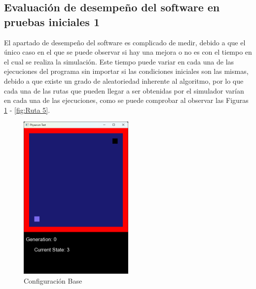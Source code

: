 \subsection{Evaluaci\'on de desempe\~no del software en pruebas iniciales 1}
    El apartado de desempe\~no del software es complicado de
        medir, debido a que el \'unico caso en el que se puede
        observar si hay una mejora o no es con el tiempo en el cual
        se realiza la simulaci\'on.
    \vskip 0.5cm
    Este tiempo puede variar en cada una de las ejecuciones del
        programa sin importar si las condiciones iniciales son las
        mismas, debido a que existe un grado de aleatoriedad
        inherente al algoritmo, por lo que cada una de las rutas que
        pueden llegar a ser obtenidas por el simulador var\'ian en cada
        una de las ejecuciones, como se puede comprobar al observar
        las Figuras \ref{fig:Ruta 1} - \ref{fig:Ruta 5}.
    \vskip 0.5cm
    \begin{figure}[htbp]
        \centering
        \includegraphics[width=0.5\textwidth]{./images/Pruebas/simulador/image009.png}
        \caption{Configuraci\'on Base}
        \label{fig:Ruta 1}
    \end{figure}
    \vskip 0.5cm
